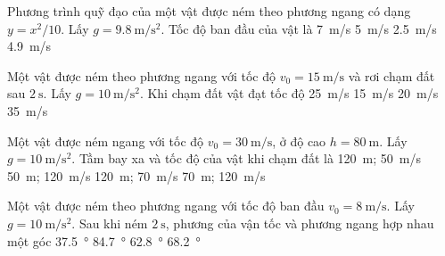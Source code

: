 \begin{ex}
	Phương trình quỹ đạo của một vật được ném theo phương ngang có dạng $y=x^2/10$. Lấy $g=\SI{9.8}{\meter/\second^2}$. Tốc độ ban đầu của vật là 
	\choice
	{\SI{7}{\meter/\second}}
	{\SI{5}{\meter/\second}}
	{\SI{2.5}{\meter/\second}}
	{\SI{4.9}{\meter/\second}}
	\loigiai{}
\end{ex}
\begin{ex}
	Một vật được ném theo phương ngang với tốc độ $v_0=\SI{15}{\meter/\second}$ và rơi chạm đất sau $\SI{2}{\second}$. Lấy $g=\SI{10}{\meter/\second^2}$. Khi chạm đất vật đạt tốc độ
	\choice
	{\SI{25}{\meter/\second}}
	{\SI{15}{\meter/\second}}
	{\SI{20}{\meter/\second}}
	{\SI{35}{\meter/\second}}
	\loigiai{}
\end{ex}
\begin{ex}
Một vật được ném ngang với tốc độ $v_0=\SI{30}{\meter/\second}$, ở độ cao $h=\SI{80}{\meter}$. Lấy $g=\SI{10}{\meter/\second^2}$. Tầm bay xa và tốc độ của vật khi chạm đất là	
	\choice
	{\SI{120}{\meter}; \SI{50}{\meter/\second}}
	{\SI{50}{\meter}; \SI{120}{\meter/\second}}
	{\SI{120}{\meter}; \SI{70}{\meter/\second}}
	{\SI{70}{\meter}; \SI{120}{\meter/\second}}
	\loigiai{}
\end{ex}
\begin{ex}
Một vật được ném theo phương ngang với tốc độ ban đầu $v_0=\SI{8}{\meter/\second}$. Lấy $g=\SI{10}{\meter/\second^2}$. Sau khi ném $\SI{2}{\second}$, phương của vận tốc và phương ngang hợp nhau một góc 	
	\choice
	{\SI{37.5}{\degree}}
	{\SI{84.7}{\degree}}
	{\SI{62.8}{\degree}}
	{\SI{68.2}{\degree}}
	\loigiai{}
\end{ex}
